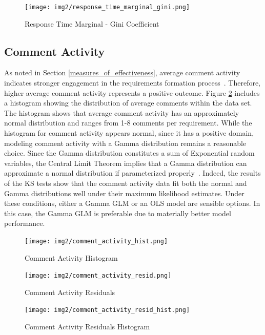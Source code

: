 \begin{figure}
  \texttt{[image: img2/response\_time\_marginal\_gini.png]}
\caption{Response Time Marginal - Gini Coefficient}
\label{response_time_marginal_gini}
\end{figure}

\subsection{Comment Activity}
\label{comment_activity}

As noted in Section \ref{measures_of_effectiveness}, average comment activity indicates stronger engagement in the requirements formation process~\cite{toral}. Therefore, higher average comment activity represents a positive outcome. Figure \ref{comment_activity_hist} includes a histogram showing the distribution of average comments within the data set. The histogram shows that average comment activity has an approximately normal distribution and ranges from 1-8 comments per requirement. While the histogram for comment activity appears normal, since it has a positive domain, modeling comment activity with a Gamma distribution remains a reasonable choice. Since the Gamma distribution constitutes a sum of Exponential random variables, the Central Limit Theorem implies that a Gamma distribution can approximate a normal distribution if parameterized properly~\cite{wackerly}. Indeed, the results of the KS tests show that the comment activity data fit both the normal and Gamma distributions well under their maximum likelihood estimates. Under these conditions, either a Gamma GLM or an OLS model are sensible options. In this case, the Gamma GLM is preferable due to materially better model performance.

\begin{figure}
 \texttt{[image: img2/comment\_activity\_hist.png]}
\caption{Comment Activity Histogram}
\label{comment_activity_hist}
\end{figure}

\begin{figure}
 \texttt{[image: img2/comment\_activity\_resid.png]}
\caption{Comment Activity Residuals}
\label{comment_activity_resid}
\end{figure}

\begin{figure}
 \texttt{[image: img2/comment\_activity\_resid\_hist.png]}
\caption{Comment Activity Residuals Histogram}
\label{comment_activity_resid_hist}
\end{figure}

